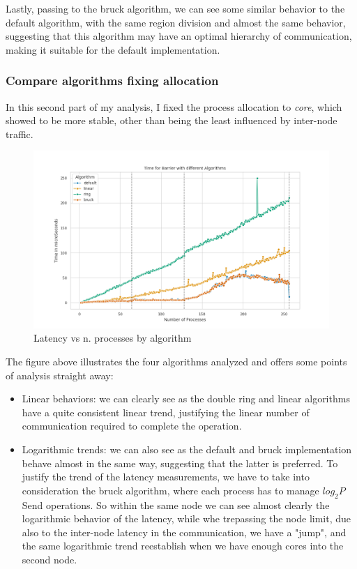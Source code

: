 \documentclass{article}
\begin{document}
	Lastly, passing to the bruck algorithm, we can see some similar behavior to the default algorithm, with the same region division and almost the same behavior, suggesting that this algorithm may have an optimal hierarchy of communication, making it suitable for the default implementation.
	
	
	\subsubsection{Compare algorithms fixing allocation}
	
	In this second part of my analysis, I fixed the process allocation to \textit{core}, which showed to be more stable, other than being the least influenced by inter-node traffic.
	
	
	\begin{figure}[h]
		\centering
		\includegraphics[width=0.7\linewidth]{../exercise1/plots/barrier_core}
		\caption{Latency vs n. processes by algorithm}
		\label{fig:barriercore}
	\end{figure}
	
	The figure above illustrates the four algorithms analyzed and offers some points of analysis straight away:
	
	\begin{itemize}
		\item Linear behaviors: we can clearly see as the double ring and linear algorithms have a quite consistent linear trend, justifying the linear number of communication required to complete the operation.
		\item Logarithmic trends: we can also see as the default and bruck implementation behave almost in the same way, suggesting that the latter is preferred. To justify the trend of the latency measurements, we have to take into consideration the bruck algorithm, where each process has to manage $log_2P$ Send operations. So within the same node we can see almost clearly the logarithmic behavior of the latency, while whe trepassing the node limit, due also to the inter-node latency in the communication, we have a "jump", and the same logarithmic trend reestablish when we have enough cores into the second node.
	\end{itemize}
	
\end{document}
